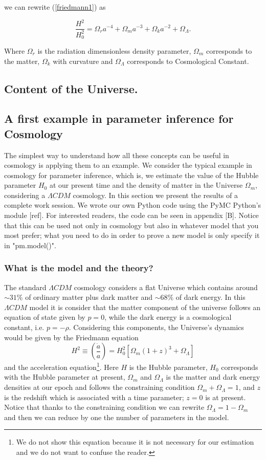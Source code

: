 \documentclass[onecolumn,           %
               showpacs,            %
               preprintnumbers,     %
               aps,                 %
               prl,          	    %
               letterpaper,             %
               superscriptaddress,      %
               nofootinbib,         %
               tightenlines,        %
               floats,floatfix      %
               ,usenatbib,
               ]{revtex4-1}
\begin{document}
we can rewrite (\ref{friedmann1}) as

\begin{equation}
\frac{H^2}{H_0^2} = \Omega_r a^{-4} + \Omega_m a^{-3} + \Omega_k a^{-2} + \Omega_{\Lambda} .
\end{equation}

Where $\Omega_r$ is the radiation dimensionless density parameter, $\Omega_m$ corresponds to the matter, $\Omega_k$ with curvature and $\Omega_{\Lambda}$ corresponds to Cosmological Constant.

\subsection{Content of the Universe.}

\subsection{A first example in parameter inference for Cosmology}

The simplest way to understand how all these concepts can be useful in cosmology is applying them to an example. We consider the typical example in cosmology for parameter inference, which is, we estimate the value of the Hubble parameter $H_0$ at our present time and the density of matter in the Universe $\Omega_m$, considering a $\Lambda CDM$ cosmology. In this section we present the results of a complete work session. We wrote our own Python code using the PyMC Python's module [ref]. For interested readers, the code can be seen in appendix [B]. Notice that this can be used not only in cosmology but also in whatever model that you most prefer; what you need to do in order to prove a new model is only specify it in "pm.model()". 

\subsubsection{What is the model and the theory?}

The standard $\Lambda CDM$ cosmology considers a flat Universe which contains around $\sim 31\%$ of ordinary matter plus dark matter and $\sim 68\%$ of dark energy. In this $\Lambda CDM$ model it is consider that the matter component of the universe follows an equation of state given by $p=0$, while the dark energy is a cosmological constant, i.e. $p=-\rho$. Considering this components, the Universe's dynamics would be given by the Friedmann equation
\begin{equation}
H^2\equiv\left(\frac{\dot a}{a}\right)=H_0^2[\Omega_m(1+z)^3+\Omega_{\Lambda}]
\end{equation}
and the acceleration equation\footnote{We do not show this equation because it is not necessary for our estimation and we do not want to confuse the reader.}. Here $H$ is the Hubble parameter, $H_0$ corresponds with the Hubble parameter at present, $\Omega_m$ and $\Omega_\Lambda$ is the matter and dark energy densities at our epoch and follows the constraining condition $\Omega_m+\Omega_\Lambda=1$, and $z$ is the redshift which is associated with a time parameter; $z=0$ is at present. Notice that thanks to the constraining condition we can rewrite $\Omega_\Lambda=1-\Omega_m$ and then we can reduce by one the number of parameters in the model. 
\end{document}
